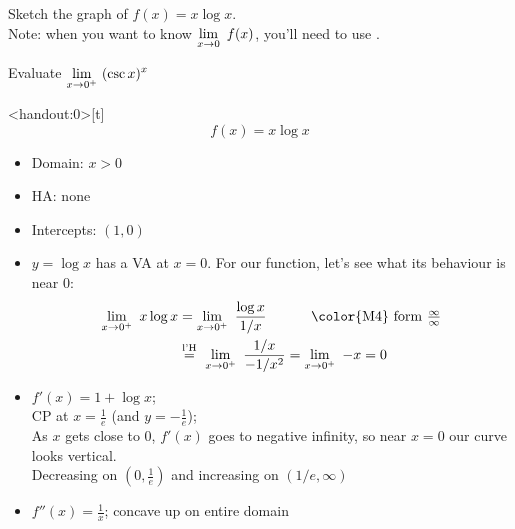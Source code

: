 \begin{frame}[t]


Sketch the graph of $f(x)=x\log x$.\\

Note: when you want to know $\displaystyle\displaystyle\lim_{x \to 0}~ f(x)$, you'll need to use \hosp.

\vfill
Evaluate $\displaystyle\displaystyle\lim_{x \to 0^+}~(\csc x)^{x}$
\end{frame}

\begin{frame}<handout:0>[t]
\[f(x)=x\log x\]\pause\color{answercolor}

\begin{itemize}\color{answercolor}
\item Domain: $x>0$
\item HA: none
\item Intercepts: $(1,0)$
\item $y=\log x$ has a VA at $x=0$. For our function, let's see what its behaviour is near 0:
\begin{align*}
\dlimx{0^+} x\log x&=\dlimx{0^+}\frac{\log x}{1/x} \hspace{1cm}\mbox{ \color{M4} form $\frac{\infty}{\infty}$}\\
&\lheq\dlimx{0^+} \frac{1/x}{-1/x^2}=\dlimx{0^+}-x=0
\end{align*}
\item $f'(x) = 1+\log x$;\\ CP at $x=\frac1e$ (and $y=-\frac1e$);\\
 As $x$ gets close to 0, $f'(x)$ goes to negative infinity, so near $x=0$ our curve looks vertical.\\
Decreasing on $(0,\frac1e)$ and increasing on $(1/e,\infty)$
\item $f''(x)=\frac1x$; concave up on entire domain
\end{itemize}
\end{frame}


